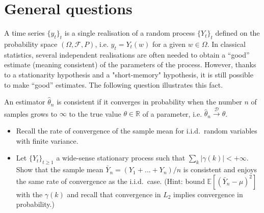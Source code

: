 \documentclass[11pt]{article}
\begin{document}
\section{General questions}

A time series $\{y_t\}_t$ is a single realisation of a random process $\{Y_t\}_t$ defined on the probability space $(\Omega, \mathcal{F}, P)$, i.e. $y_t = Y_t(w)$ for a given $w\in\Omega$.
In classical statistics, several independent realisations are often needed to obtain a ``good'' estimate (meaning consistent) of the parameters of the process.
However, thanks to a stationarity hypothesis and a "short-memory" hypothesis, it is still possible to make ``good'' estimates.
The following question illustrates this fact.

\begin{exercise}
An estimator $\hat{\theta}_n$ is consistent if it converges in probability when the number $n$ of samples grows to $\infty$ to the true value $\theta\in\mathbb{R}$ of a parameter, i.e. $\hat{\theta}_n \xrightarrow{\mathcal{D}} \theta$.

\begin{itemize}
    \item Recall the rate of convergence of the sample mean for i.i.d.\ random variables with finite variance.
    \item Let $\{Y_t\}_{t\geq 1}$ a wide-sense stationary process such that $\sum_k |\gamma (k)| < +\infty$. 
    Show that the sample mean $\bar{Y}_n = (Y_1+\dots+Y_n)/n$ is consistent and enjoys the same rate of convergence as the i.i.d.\ case. (Hint: bound $\mathbb{E}[(\bar{Y}_n-\mu)^2]$ with the $\gamma (k)$ and recall that convergence in $L_2$ implies convergence in probability.)
\end{itemize}

\end{exercise}
\end{document}
